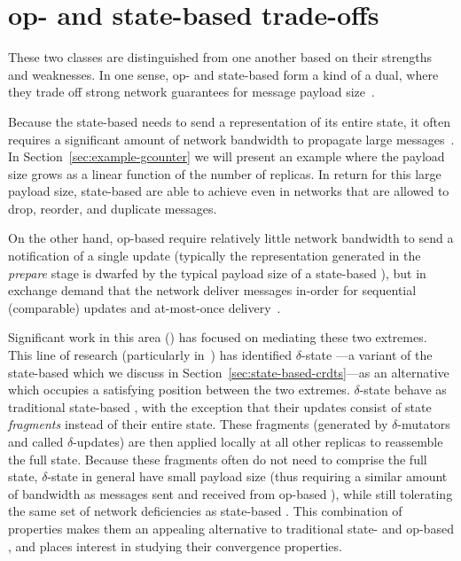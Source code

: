 \section{op- and state-based trade-offs}

These two classes are distinguished from one another based on their strengths
and weaknesses. In one sense, op- and state-based \CRDTs form a kind of a dual,
where they trade off strong network guarantees for message payload
size~\citep{baquero14}.

Because the state-based \CRDT needs to send a representation of its entire
state, it often requires a significant amount of network bandwidth to propagate
large messages~\citep{almedia18}. In Section~\ref{sec:example-gcounter} we will
present an example where the payload size grows as a linear function of the
number of replicas. In return for this large payload size, state-based \CRDTs
are able to achieve \SEC even in networks that are allowed to drop, reorder, and
duplicate messages.

On the other hand, op-based \CRDTs require relatively little network bandwidth
to send a notification of a single update (typically the representation
generated in the \textit{prepare} stage is dwarfed by the typical payload size
of a state-based \CRDT), but in exchange demand that the network deliver
messages in-order for sequential (comparable) updates and
at-most-once delivery~\citep{shapiro11}.

Significant work in this area (\cite{almedia18, enes18, cabrita17,
vanDerLinde16}) has focused on mediating these two extremes. This line of
research (particularly in~\citet{almedia18}) has identified $\delta$-state
\CRDTs---a variant of the state-based \CRDT which we discuss in
Section~\ref{sec:state-based-crdts}---as an alternative which occupies a
satisfying position between the two extremes.  $\delta$-state \CRDTs behave as
traditional state-based \CRDTs, with the exception that their updates consist of
state \emph{fragments} instead of their entire state. These fragments (generated
by $\delta$-mutators and called $\delta$-updates) are then applied locally at
all other replicas to reassemble the full state. Because these fragments often
do not need to comprise the full state, $\delta$-state \CRDTs in general have
small payload size (thus requiring a similar amount of bandwidth as messages
sent and received from op-based \CRDTs), while still tolerating the same set of
network deficiencies as state-based \CRDTs. This combination of properties makes
them an appealing alternative to traditional state- and op-based \CRDTs, and
places interest in studying their convergence properties.

